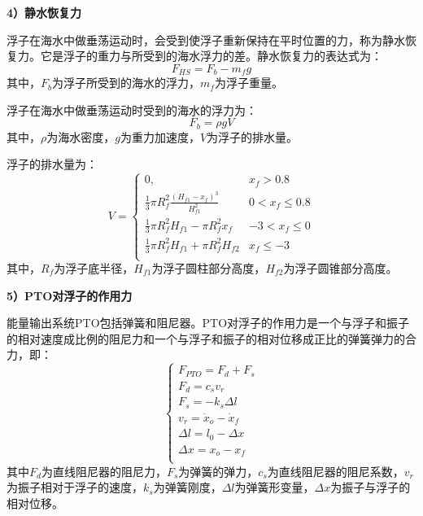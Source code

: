 \documentclass{my_paper}
\begin{document}
\textbf{4）静水恢复力}

浮子在海水中做垂荡运动时，会受到使浮子重新保持在平时位置的力，称为静水恢复力。它是浮子的重力与所受到的海水浮力的差\cite{黄秀秀2019振荡浮子式波浪发电系统的功率控制}。静水恢复力的表达式为：
\begin{equation}
    F_{HS}=F_{b}-m_{f}g\label{Q1fjingshuihuifuli}
\end{equation}
其中，$F_{b}$为浮子所受到的海水的浮力，$m_{f}$为浮子重量。

浮子在海水中做垂荡运动时受到的海水的浮力为：
\begin{equation}
    F_{b}=\rho g V \label{Q1ffuli}
\end{equation}
其中，$\rho$为海水密度，$g$为重力加速度，$V$为浮子的排水量。

浮子的排水量为：
\begin{equation}\label{Q1fpaishuiliang}
    V=\left\{\begin{matrix}
    0,\quad & x_{f}>0.8 \\
    \frac{1}{3}\pi R_{f}^{2}\frac{(H_{f1}-x_{f})^{3}}{H_{f1}^{2}} & 0<x_{f}\leq 0.8 \\
    \frac{1}{3}\pi R_{f}^{2}H_{f1}-\pi R_{f}^{2}x_{f} & -3<x_{f}\leq 0 \\
    \frac{1}{3}\pi R_{f}^{2}H_{f1}+\pi R_{f}^{2}H_{f2} & x_{f}\leq -3 \\
    \end{matrix}\right.
\end{equation}
其中，$R_{f}$为浮子底半径，$H_{f1}$为浮子圆柱部分高度，$H_{f2}$为浮子圆锥部分高度。

\textbf{5）PTO对浮子的作用力}

能量输出系统PTO包括弹簧和阻尼器。PTO对浮子的作用力是一个与浮子和振子的相对速度成比例的阻尼力和一个与浮子和振子的相对位移成正比的弹簧弹力的合力，即：
\begin{equation}\label{Q1fPTO}
    \left\{\begin{matrix}
    F_{PTO}=F_{d}+F_{s}  \\
    F_{d}=c_{s} v_{r}  \\
    F_{s}=-k_{s}\Delta l  \\ 
    v_{r}=\dot x_{o}-\dot x_{f} \\
    \Delta l=l_{0}-\Delta x \\
    \Delta x=x_{o}-x_{f} \\
    \end{matrix}\right.
\end{equation}
其中$F_{d}$为直线阻尼器的阻尼力，$F_{s}$为弹簧的弹力，$c_{s}$为直线阻尼器的阻尼系数，$v_{r}$为振子相对于浮子的速度，$k_{s}$为弹簧刚度，$\Delta l$为弹簧形变量，$\Delta x$为振子与浮子的相对位移。
\end{document}
